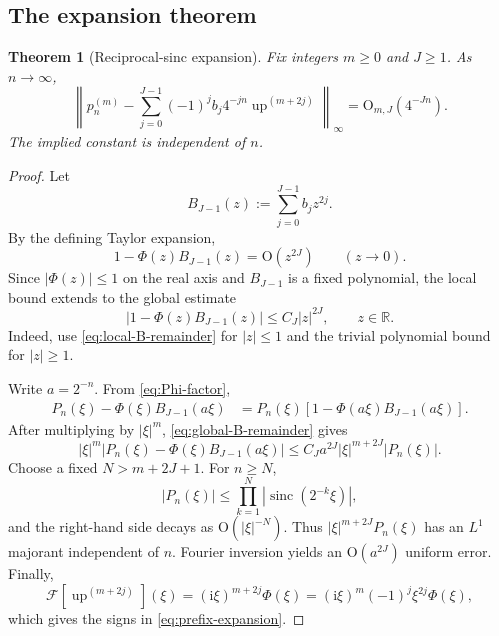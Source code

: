 \documentclass[11pt]{article}
\numberwithin{equation}{section}
\newtheorem{theorem}{Theorem}[section]
\theoremstyle{definition}
\theoremstyle{remark}
\newcommand{\R}{\mathbb R}
\newcommand{\Up}{\operatorname{up}}
\newcommand{\sinc}{\operatorname{sinc}}
\newcommand{\ii}{\mathrm i}
\newcommand{\Oh}{\mathrm O}
\newcommand{\abs}[1]{\left|#1\right|}
\begin{document}
\subsection{The expansion theorem}

\begin{theorem}[Reciprocal-sinc expansion]
\label{thm:prefix-expansion}
Fix integers $m\ge0$ and $J\ge1$.  As $n\to\infty$,
\begin{equation}
 \boxed{
 \left\|
 p_n^{(m)}-
 \sum_{j=0}^{J-1}(-1)^jb_j4^{-jn}\Up^{(m+2j)}
 \right\|_\infty
 =\Oh_{m,J}(4^{-Jn}).}
 \label{eq:prefix-expansion}
\end{equation}
The implied constant is independent of $n$.
\end{theorem}

\begin{proof}
Let
\[
 B_{J-1}(z):=\sum_{j=0}^{J-1}b_jz^{2j}.
\]
By the defining Taylor expansion,
\begin{equation}
 1-\Phi(z)B_{J-1}(z)=\Oh(z^{2J})
 \qquad(z\to0).
 \label{eq:local-B-remainder}
\end{equation}
Since $\abs{\Phi(z)}\le1$ on the real axis and $B_{J-1}$ is a fixed polynomial, the local bound extends to the global estimate
\begin{equation}
 \abs{1-\Phi(z)B_{J-1}(z)}\le C_J\abs z^{2J},
 \qquad z\in\R.
 \label{eq:global-B-remainder}
\end{equation}
Indeed, use \eqref{eq:local-B-remainder} for $\abs z\le1$ and the trivial polynomial bound for $\abs z\ge1$.

Write $a=2^{-n}$.  From \eqref{eq:Phi-factor},
\begin{align}
 P_n(\xi)-\Phi(\xi)B_{J-1}(a\xi)
 &=P_n(\xi)\left[1-\Phi(a\xi)B_{J-1}(a\xi)\right].
 \label{eq:Fourier-expansion-remainder}
\end{align}
After multiplying by $\abs\xi^m$, \eqref{eq:global-B-remainder} gives
\begin{equation}
 \abs\xi^m
 \abs{P_n(\xi)-\Phi(\xi)B_{J-1}(a\xi)}
 \le C_Ja^{2J}\abs\xi^{m+2J}\abs{P_n(\xi)}.
 \label{eq:Fourier-majorant}
\end{equation}
Choose a fixed $N>m+2J+1$.  For $n\ge N$,
\[
 \abs{P_n(\xi)}\le\prod_{k=1}^{N}\abs{\sinc(2^{-k}\xi)},
\]
and the right-hand side decays as $\Oh(\abs\xi^{-N})$.  Thus
\(\abs\xi^{m+2J}P_n(\xi)\) has an $L^1$ majorant independent of $n$.  Fourier inversion yields an $\Oh(a^{2J})$ uniform error.  Finally,
\[
 \mathcal F[\Up^{(m+2j)}](\xi)
 =(\ii\xi)^{m+2j}\Phi(\xi)
 =(\ii\xi)^m(-1)^j\xi^{2j}\Phi(\xi),
\]
which gives the signs in \eqref{eq:prefix-expansion}.
\end{proof}
\end{document}
